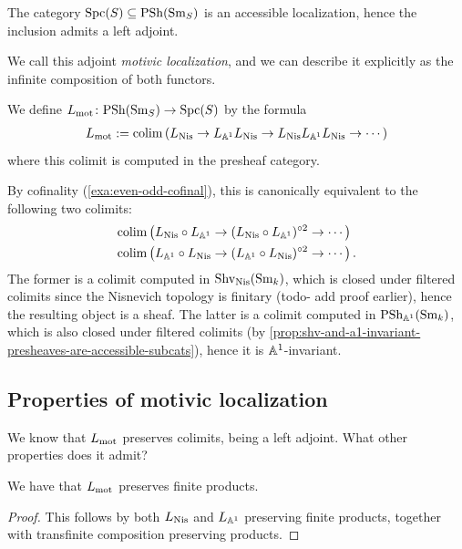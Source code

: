 \documentclass[11pt,openany]{book}
\renewcommand{\Pre}{\mathrm{PSh}}
\begin{document}
\begin{proposition} The category $\mathrm{Spc}(S) \subseteq \mathrm{PSh}(\mathrm{Sm}_S)$ is an accessible localization, hence the inclusion admits a left adjoint.
\end{proposition}
We call this adjoint \textit{motivic localization}, and we can describe it explicitly as the infinite composition of both functors.

\begin{definition} We define $L_\mot \colon \Pre(\Sm_S) \to \Spc(S)$ by the formula
\begin{align*}
    L_{\mathrm{mot}} := \mathrm{colim} \left( L_{\mathrm{Nis}} \to L_{\mathbb{A}^1} L_{\mathrm{Nis}} \to L_{\mathrm{Nis}} L_{\mathbb{A}^1}L_{\mathrm{Nis}} \to \cdots \right)
\end{align*}
where this colimit is computed in the presheaf category.
\end{definition}

\begin{remark}\label{rmk:Lmot-cofinality} 
By cofinality (\autoref{exa:even-odd-cofinal}), this is canonically equivalent to the following two colimits:
\begin{align*}
    &\mathrm{colim} \left( L_{\mathrm{Nis}} \circ L_{\mathbb{A}^1} \to (L_{\mathrm{Nis}} \circ L_{\mathbb{A}^1})^{\circ 2} \to \cdots  \right) \\
    &\mathrm{colim} \left( L_{\mathbb{A}^1}\circ L_{\mathrm{Nis}} \to ( L_{\mathbb{A}^1} \circ L_{\mathrm{Nis}})^{\circ 2} \to \cdots  \right).
\end{align*}
The former is a colimit computed in $\mathrm{Shv}_{\mathrm{Nis}}(\mathrm{Sm}_k)$, which is closed under filtered colimits since the Nisnevich topology is finitary (todo- add proof earlier), hence the resulting object is a sheaf. The latter is a colimit computed in $\Pre_{\A^1}(\Sm_k)$, which is also closed under filtered colimits (by \autoref{prop:shv-and-a1-invariant-presheaves-are-accessible-subcats}), hence it is $\mathbb{A}^1$-invariant.
\end{remark}


\subsection{Properties of motivic localization}

We know that $L_{\mathrm{mot}}$ preserves colimits, being a left adjoint. What other properties does it admit?

\begin{proposition} \cite[C.6]{Hoyois} We have that $L_{\mathrm{mot}}$ preserves finite products.
\end{proposition}
\begin{proof} This follows by both $L_{\mathrm{Nis}}$ and $L_{\mathbb{A}^1}$ preserving finite products, together with transfinite composition preserving products.
\end{proof}
\end{document}

